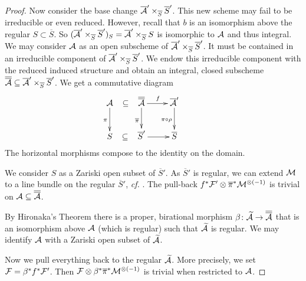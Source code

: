 \begin{proof}
Now consider the base change $\overline
{\mathcal{A}}'\times_{\overline S}\overline S'$. This new scheme
may  fail to be irreducible or even
reduced. However, recall that $b$ is an isomorphism above the regular $S\subset
\overline S$. So $(\overline
{\mathcal{A}}'\times_{\overline S}\overline S')_S =
\overline{\mathcal{A}}'\times_{\overline S}S$  is isomorphic to $\mathcal{A}$ and thus
integral. We may consider $\mathcal{A}$ as an open subscheme of
$\overline
{\mathcal{A}}'\times_{\overline S}\overline S'$. It must be contained in an irreducible component of
$\overline
{\mathcal{A}}'\times_{\overline S}\overline S'$. We endow this irreducible component with the
reduced induced structure and obtain an integral, closed subscheme
$\overline{\overline{\mathcal{A}}}\subseteq \overline
{\mathcal{A}}'\times_{\overline S}\overline S'$. We get a commutative diagram
\begin{equation*}
  \xymatrix{
\cA\ar@{}[r]|-*[@]{\subset}\ar[d]_\pi &
 \overline{\overline{\cA}} \ar[r]^f \ar[d]_{\overline\pi} & \overline{\cA}' \ar[d]_{\pi\circ\rho}&\\
S \ar@{}[r]|-*[@]{\subset} &\overline{S}' \ar[r] &      \overline{S} &
  }  
\end{equation*}
The horizontal  morphisms compose to the identity on the domain. %

We consider $S$ as a Zariski open subset of $\overline S'$. 
As $\overline S'$ is regular, we can extend ${\mathcal M}$ to a line bundle on
the regular $\overline S'$, \textit{cf.} \cite[Corollary~11.41]{GoertzWedhorn}. %
The pull-back $f^*{\mathcal F}'\otimes\overline\pi^*{\mathcal M}^{\otimes(-1)}$ is
trivial on $\mathcal{A}\subseteq\overline{\overline{\mathcal{A}}}$. 

By Hironaka's Theorem there is a proper, birational morphism $\beta\colon\widetilde
{\mathcal{A}}\rightarrow\overline{\overline{\mathcal{A}}}$ that is an isomorphism above $\mathcal{A}$
(which is regular) 
such that $\widetilde{\mathcal{A}}$ is regular. We may identify $\mathcal{A}$ with a Zariski open subset of
$\widetilde {\mathcal{A}}$.

Now we pull everything back to the regular  $\widetilde{\mathcal{A}}$.
More precisely, we set ${\mathcal F} = \beta^*f^*{\mathcal F}'$.
Then
${\mathcal F}\otimes\beta^*\overline\pi^*{\mathcal M}^{\otimes(-1)}$ is trivial when restricted to
$\mathcal{A}$. 


\end{proof}
